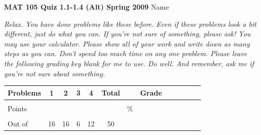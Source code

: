 \documentclass[12pt]{article}
\begin{document}
{\bf MAT 105 Quiz 1.1-1.4 (Alt) Spring 2009} \hspace{.4in} {\large Name} \hrulefill

\hrulefill

 \emph{Relax.  You have done problems like these before.  Even if these problems look a bit different, just do what you can.  If you're not sure of something, please ask! You may use your calculator.  Please show all of your work and write down as many steps as you can.  Don't spend too much time on any one problem.  Please leave the following grading key blank for me to use.  Do well.  And remember, ask me if you're not sure about something.}

\begin{center}

\begin{tabular}
{|l|c|c|c|c|c|c|c|c|c|c|c|c|} \hline

 Problems & \hspace{5 pt} 1 \hspace{5 pt}  & \hspace{5 pt} 2 \hspace{5 pt} & \hspace{5 pt} 3 \hspace{5 pt} & \hspace{5 pt} 4 \hspace{5 pt} &  \hspace{5 pt} Total  \hspace{5 pt} & &  \hspace{5 pt} Grade \hspace{5 pt}  \\ \hline
&&&&& &&\\  
Points &&&&& &    \hspace{.8in}\% &  \\ 
&&&&& && \\  \hline
Out of & 16 & 16 & 6 & 12 &50 & & \\ \hline

\end {tabular}

\end{center}

\hrulefill
\end{document}
